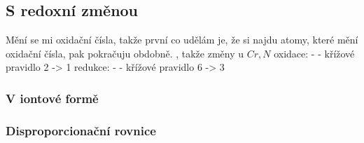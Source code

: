 \documentclass{article}
\begin{document}
\subsection{S redoxní změnou}
Mění se mi oxidační čísla, takže první co udělám je, že si najdu atomy, které mění oxidační čísla, pak pokračuju obdobně.
, takže změny u $Cr, N$
oxidace:  - - křížové pravidlo 2 -> 1
redukce:  - - křížové pravidlo 6 -> 3

\subsubsection{V iontové formě}

\subsubsection{Disproporcionační rovnice}
\end{document}
